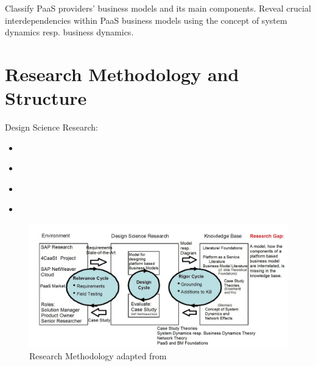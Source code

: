 Classify PaaS providers' business models and its main components. Reveal crucial interdependencies within PaaS business models using the concept of system dynamics resp. business dynamics.

\section{Research Methodology and Structure}

Design Science Research:
\begin{itemize}
	\item \citet{March1995}
	\item \citet{Hevner2004}
	\item \citet{Hevner2007}
	\item \citet{Peffers2007}
\end{itemize}

\begin{figure}[htb]
	\centering
	\includegraphics[width=\textwidth]{gfx/researchMethodology}
	\caption[Research Methodology]{Research Methodology adapted from \citet{Hevner2007}}
	\label{fig:rm}
\end{figure}
